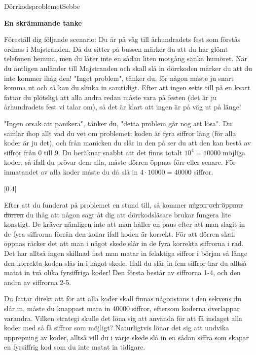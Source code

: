 \documentclass{spektraklet}
\begin{document}
\begin{artikel}{Dörrkodsproblemet}{Sebbe}
\begin{twocolumns}
  \textbf{En skrämmande tanke}

Föreställ dig följande scenario: Du är på väg till århundradets fest som förstås ordnas i Majstranden. Då du sitter på bussen märker du att du har glömt telefonen hemma, men du låter inte en sådan liten motgång sänka humöret. När du äntligen anländer till Majstranden och skall slå in dörrkoden märker du att du inte kommer ihåg den! "Inget problem", tänker du, för någon måste ju snart komma ut och så kan du slinka in samtidigt. Efter att ingen setts till på en kvart fattar du plötsligt att alla andra redan måste vara på festen (det är ju århundradets fest vi talar om), så det är klart att ingen är på väg ut på länge!

"Ingen orsak att panikera", tänker du, "detta problem går nog att lösa". Du samlar ihop allt vad du vet om problemet: koden är fyra siffror lång (för alla koder är ju det), och från manicken du slår in den på ser du att den kan bestå av siffror från 0 till 9. Du beräknar snabbt att det finns totalt $ 10^4 = 10000$ möjliga koder, så ifall du prövar dem alla, måste dörren öppnas förr eller senare. För inmatandet av alla koder måste du då slå in $ 4 \cdot 10000 = 40000$ siffror.

[0.4\columnwidth]


Efter att du funderat på problemet en stund till, så kommer \sout{någon och öppnar dörren} du ihåg att någon sagt åt dig att dörrkodsläsare brukar fungera lite konstigt. De kräver nämligen inte att man håller en paus efter att man slagit in de fyra siffrorna förrän den kollar ifall koden är korrekt. För att dörren skall öppnas räcker det att man i något skede slår in de fyra korrekta siffrorna i rad. Det har alltså ingen skillnad fast man matar in felaktiga siffror i början så länge den korrekta koden slås in i något skede. Ifall du slår in fem siffror har du alltså matat in två olika fyrsiffriga koder! Den första består av siffrorna 1-4, och den andra av siffrorna 2-5.

Du fattar direkt att för att alla koder skall finnas någonstans i den sekvens du slår in, måste du knappast mata in 40000 siffror, eftersom koderna överlappar varandra. Vilken strategi skulle det löna sig att använda för att få inslaget alla koder med så få siffror som möjligt? Naturligtvis lönar det sig att undvika upprepning av koder, alltså vill du i varje skede slå in en sådan siffra som skapar en fyrsiffrig kod som du inte matat in tidigare.


\end{twocolumns}
\end{artikel}
\end{document}
